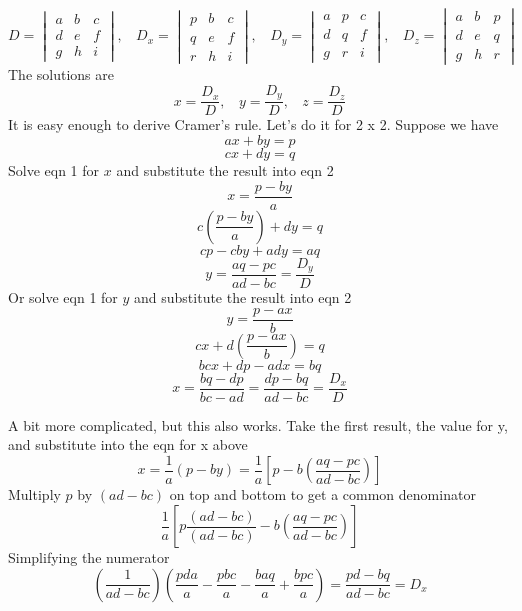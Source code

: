 \documentclass[11pt, oneside]{article}
\begin{document}
\[ D = 
\begin{vmatrix} 
  a  &  b  &  c  \\ 
  d  &  e  &  f   \\
  g  &  h  &  i
\end{vmatrix}, \ \ \ \ 
D_x = 
\begin{vmatrix} 
  p  &  b  &  c  \\ 
  q  &  e  &  f   \\
  r  &  h  &  i
\end{vmatrix},   \ \ \ \
D_y = 
\begin{vmatrix} 
  a  &  p  &  c  \\ 
  d  &  q  &  f   \\
  g  &  r  &  i
\end{vmatrix},  \ \ \ \ 
D_z = 
\begin{vmatrix}
  a  &  b  &  p  \\ 
  d  &  e  &  q   \\
  g  &  h  &  r
\end{vmatrix} 
\]
The solutions are 
\[ x = \frac{D_x}{D}, \ \ \ \ 
y = \frac{D_y}{D} , \ \ \ \
z = \frac{D_z}{D} \]
It is easy enough to derive Cramer's rule.  Let's do it for 2 x 2.  Suppose we have
\[ ax + by = p \]
\[ cx + dy = q \]
Solve eqn 1 for $x$ and substitute the result into eqn 2
\[ x = \frac{p - by}{a} \]
\[ c (\frac{p - by}{a}) + dy = q \]
\[ cp - cby + ady = aq \]
\[ y = \frac{aq-pc}{ad-bc} = \frac{D_y}{D} \]
Or solve eqn 1 for $y$ and substitute the result into eqn 2
\[ y = \frac{p - ax}{b} \]
\[ cx + d(\frac{p - ax}{b}) = q \]
\[ bcx + dp - adx = bq \]
\[ x = \frac{bq-dp}{bc-ad} = \frac{dp-bq}{ad-bc} = \frac{D_x}{D} \]


A bit more complicated, but this also works.  Take the first result, the value for y, and substitute into the eqn for x above
\[ x = \frac{1}{a} (p - by) = \frac{1}{a} [p - b(\frac{aq-pc}{ad-bc} )]                     \]
Multiply $p$ by $(ad-bc)$ on top and bottom to get a common denominator
\[ \frac{1}{a} [p \frac{(ad-bc)}{(ad-bc)} - b(\frac{aq-pc}{ad-bc} )]   \]
Simplifying the numerator
\[ (\frac{1}{ad-bc}) (\frac{pda}{a} - \frac{pbc}{a} - \frac{baq}{a} + \frac{bpc}{a} ) =  \frac{pd - bq}{ad-bc} =  D_x  \]
\end{document}
